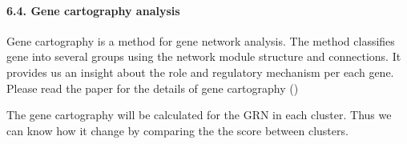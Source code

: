 \documentclass[letterpaper,10pt,english]{sphinxmanual}
\begin{document}
\paragraph{6.4. Gene cartography analysis}
\label{\detokenize{notebooks/04_Network_analysis/Network_analysis_with_with_Paul_etal_2015_data:6.4.-Gene-cartography-analysis}}
Gene cartography is a method for gene network analysis. The method classifies gene into several groups using the network module structure and connections. It provides us an insight about the role and regulatory mechanism per each gene. Please read the paper for the details of gene cartography ()

The gene cartography will be calculated for the GRN in each cluster. Thus we can know how it change by comparing the the score between clusters.

{
%
\begin{sphinxVerbatim}[commandchars=\\\{\}]
\llap{\color{nbsphinxin}[58]:\,\hspace{\fboxrule}\hspace{\fboxsep}}
                                           \PYG{p}{[}  \PYG{p}{]}
                                            
                                            
\end{sphinxVerbatim}
}
\end{document}

